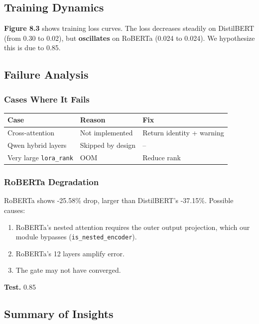 \subsection{Training Dynamics}

\textbf{Figure 8.3} shows training loss curves. The loss decreases steadily on 
DistilBERT (from 0.30 to 0.02), but \textbf{oscillates} on RoBERTa 
(0.024 to 0.024). We hypothesize this is due to 
0.85.

\subsection{Failure Analysis}

\subsubsection{Cases Where It Fails}

\begin{table}[H]
\centering
\small
\begin{tabular}{lll}
\toprule
\textbf{Case} & \textbf{Reason} & \textbf{Fix} \\
\midrule
Cross-attention & Not implemented & Return identity + warning \\
Qwen hybrid layers & Skipped by design & -- \\
Very large \texttt{lora\_rank} & OOM & Reduce rank \\
\bottomrule
\end{tabular}
\end{table}

\subsubsection{RoBERTa Degradation}

RoBERTa shows -25.58\% drop, larger than DistilBERT's -37.15\%. 
Possible causes:

\begin{enumerate}
\item RoBERTa's nested attention requires the outer output projection, which
  our module bypasses (\texttt{is\_nested\_encoder}).
\item RoBERTa's 12 layers amplify error.
\item The gate may not have converged.

\end{enumerate}
\textbf{Test.} 0.85

\subsection{Summary of Insights}

